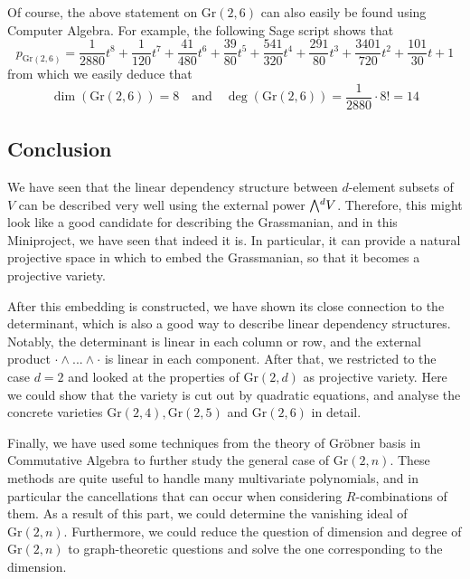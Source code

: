 \documentclass{scrartcl}
\newcommand{\Gr}{\mathrm{Gr}}
\newcommand{\extpow}{\mathchoice{{\textstyle\bigwedge}}
    {{\bigwedge}}
    {{\textstyle\wedge}}
    {{\scriptstyle\wedge}}}
\theoremstyle{definition}
\begin{document}
Of course, the above statement on $\Gr(2, 6)$ can also easily be found using Computer Algebra.
For example, the following Sage script shows that
\begin{equation*}
    p_{\Gr(2, 6)} = \frac 1 {2880} t^8 + \frac 1 {120} t^7 + \frac {41} {480} t^6 + \frac {39} {80} t^5 + \frac {541} {320} t^4 + \frac {291} {80} t^3 + \frac {3401} {720} t^2 + \frac {101} {30} t + 1
\end{equation*}
from which we easily deduce that
\begin{equation*}
    \dim(\Gr(2, 6)) = 8 \quad \text{and} \quad \deg(\Gr(2, 6)) = \frac 1 {2880} \cdot 8! = 14
\end{equation*}


\subsection*{Conclusion}
We have seen that the linear dependency structure between $d$-element subsets of $V$ can be described very well using the external power $\extpow^d V$.
Therefore, this might look like a good candidate for describing the Grassmanian, and in this Miniproject, we have seen that indeed it is.
In particular, it can provide a natural projective space in which to embed the Grassmanian, so that it becomes a projective variety.

After this embedding is constructed, we have shown its close connection to the determinant, which is also a good way to describe linear dependency structures.
Notably, the determinant is linear in each column or row, and the external product $\cdot \wedge ... \wedge \cdot$ is linear in each component.
After that, we restricted to the case $d = 2$ and looked at the properties of $\Gr(2, d)$ as projective variety.
Here we could show that the variety is cut out by quadratic equations, and analyse the concrete varieties $\Gr(2, 4), \Gr(2, 5)$ and $\Gr(2, 6)$ in detail.

Finally, we have used some techniques from the theory of Gröbner basis in Commutative Algebra to further study the general case of $\Gr(2, n)$.
These methods are quite useful to handle many multivariate polynomials, and in particular the cancellations that can occur when considering $R$-combinations of them.
As a result of this part, we could determine the vanishing ideal of $\Gr(2, n)$.
Furthermore, we could reduce the question of dimension and degree of $\Gr(2, n)$ to graph-theoretic questions and solve the one corresponding to the dimension.
\end{document}

